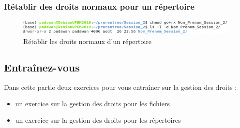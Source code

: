 \documentclass{article}
\begin{document}
\newpage

\subsubsection{Rétablir des droits normaux pour un répertoire} 

\begin{figure}[h!]
    \begin{center}
    \includegraphics[scale=0.6]{rep_Retablir_Droit.png}
    \caption{Rétablir les droits normaux d'un répertoire}
     \end{center}
\end{figure}   

\hypertarget{Entraînez-vous}{%
\subsection{Entraînez-vous}\label{Entraînez-vous}}

Dans cette partie deux exercices pour vous entraîner sur la gestion des droits :

\begin{itemize}
\item
un exercice sur la gestion des droits pour les fichiers
\item
un exercice sur la gestion des droits pour les répertoires
\end{itemize}
\end{document}
